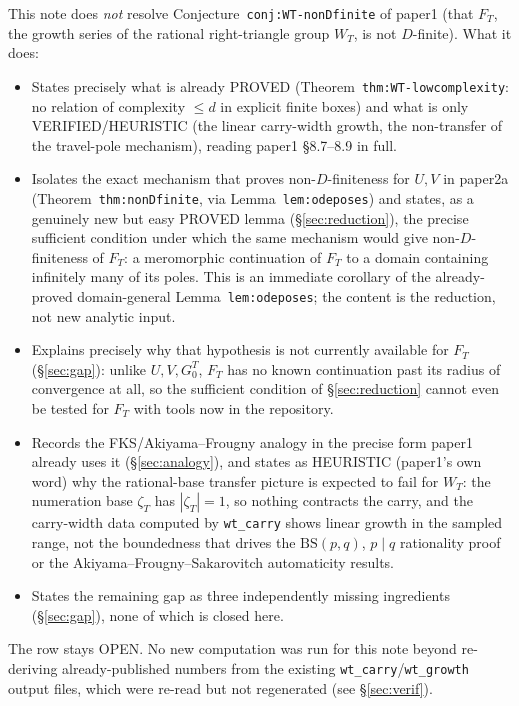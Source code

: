 \documentclass[11pt]{article}
\theoremstyle{remark}
\begin{document}
This note does \emph{not} resolve Conjecture~\texttt{conj:WT-nonDfinite} of paper1 (that $F_T$, the
growth series of the rational right-triangle group $W_T$, is not $D$-finite). What it does:
\begin{itemize}
\item States precisely what is already PROVED (Theorem~\texttt{thm:WT-lowcomplexity}: no relation of
complexity $\le d$ in explicit finite boxes) and what is only VERIFIED/HEURISTIC (the linear carry-width
growth, the non-transfer of the travel-pole mechanism), reading paper1 \S8.7--8.9 in full.
\item Isolates the exact mechanism that proves non-$D$-finiteness for $U,V$ in paper2a
(Theorem~\texttt{thm:nonDfinite}, via Lemma~\texttt{lem:odeposes}) and states, as a genuinely new but
easy PROVED lemma (\S\ref{sec:reduction}), the precise sufficient condition under which the same
mechanism would give non-$D$-finiteness of $F_T$: a meromorphic continuation of $F_T$ to a domain
containing infinitely many of its poles. This is an immediate corollary of the already-proved
domain-general Lemma~\texttt{lem:odeposes}; the content is the reduction, not new analytic input.
\item Explains precisely why that hypothesis is not currently available for $F_T$ (\S\ref{sec:gap}):
unlike $U,V,G^T_0$, $F_T$ has no known continuation past its radius of convergence at all, so the
sufficient condition of \S\ref{sec:reduction} cannot even be tested for $F_T$ with tools now in the
repository.
\item Records the FKS/Akiyama--Frougny analogy in the precise form paper1 already uses it
(\S\ref{sec:analogy}), and states as HEURISTIC (paper1's own word) why the rational-base transfer
picture is expected to fail for $W_T$: the numeration base $\zeta_T$ has $|\zeta_T|=1$, so nothing
contracts the carry, and the carry-width data computed by \texttt{wt\_carry} shows linear growth in the
sampled range, not the boundedness that drives the $\mathrm{BS}(p,q)$, $p\mid q$ rationality proof or
the Akiyama--Frougny--Sakarovitch automaticity results.
\item States the remaining gap as three independently missing ingredients (\S\ref{sec:gap}), none of
which is closed here.
\end{itemize}
The row stays OPEN. No new computation was run for this note beyond re-deriving already-published
numbers from the existing \texttt{wt\_carry}/\texttt{wt\_growth} output files, which were re-read but
not regenerated (see \S\ref{sec:verif}).
\end{document}
